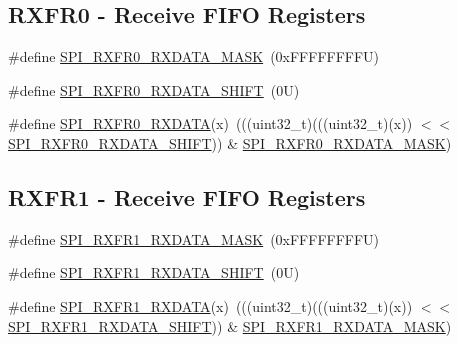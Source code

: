\subsection*{R\+X\+F\+R0 -\/ Receive F\+I\+FO Registers}
\begin{DoxyCompactItemize}
\item 
\#define \mbox{\hyperlink{group___s_p_i___register___masks_ga61ebb4d00d387b335d5b9d64d024e16f}{S\+P\+I\+\_\+\+R\+X\+F\+R0\+\_\+\+R\+X\+D\+A\+T\+A\+\_\+\+M\+A\+SK}}~(0x\+F\+F\+F\+F\+F\+F\+F\+F\+U)
\item 
\#define \mbox{\hyperlink{group___s_p_i___register___masks_ga030988e177b7d3ab914b5bb4cd734463}{S\+P\+I\+\_\+\+R\+X\+F\+R0\+\_\+\+R\+X\+D\+A\+T\+A\+\_\+\+S\+H\+I\+FT}}~(0\+U)
\item 
\#define \mbox{\hyperlink{group___s_p_i___register___masks_gaefa909022ef28f93b77915a01f7456c6}{S\+P\+I\+\_\+\+R\+X\+F\+R0\+\_\+\+R\+X\+D\+A\+TA}}(x)~(((uint32\+\_\+t)(((uint32\+\_\+t)(x)) $<$$<$ \mbox{\hyperlink{group___s_p_i___register___masks_ga030988e177b7d3ab914b5bb4cd734463}{S\+P\+I\+\_\+\+R\+X\+F\+R0\+\_\+\+R\+X\+D\+A\+T\+A\+\_\+\+S\+H\+I\+FT}})) \& \mbox{\hyperlink{group___s_p_i___register___masks_ga61ebb4d00d387b335d5b9d64d024e16f}{S\+P\+I\+\_\+\+R\+X\+F\+R0\+\_\+\+R\+X\+D\+A\+T\+A\+\_\+\+M\+A\+SK}})
\end{DoxyCompactItemize}
\subsection*{R\+X\+F\+R1 -\/ Receive F\+I\+FO Registers}
\begin{DoxyCompactItemize}
\item 
\#define \mbox{\hyperlink{group___s_p_i___register___masks_gae5778ef350adb171937498b1b49ffdb0}{S\+P\+I\+\_\+\+R\+X\+F\+R1\+\_\+\+R\+X\+D\+A\+T\+A\+\_\+\+M\+A\+SK}}~(0x\+F\+F\+F\+F\+F\+F\+F\+F\+U)
\item 
\#define \mbox{\hyperlink{group___s_p_i___register___masks_gab6747e932cee7cbdab3b46213f8d793b}{S\+P\+I\+\_\+\+R\+X\+F\+R1\+\_\+\+R\+X\+D\+A\+T\+A\+\_\+\+S\+H\+I\+FT}}~(0\+U)
\item 
\#define \mbox{\hyperlink{group___s_p_i___register___masks_gac6df902214c0e119f65e494ad20d21c6}{S\+P\+I\+\_\+\+R\+X\+F\+R1\+\_\+\+R\+X\+D\+A\+TA}}(x)~(((uint32\+\_\+t)(((uint32\+\_\+t)(x)) $<$$<$ \mbox{\hyperlink{group___s_p_i___register___masks_gab6747e932cee7cbdab3b46213f8d793b}{S\+P\+I\+\_\+\+R\+X\+F\+R1\+\_\+\+R\+X\+D\+A\+T\+A\+\_\+\+S\+H\+I\+FT}})) \& \mbox{\hyperlink{group___s_p_i___register___masks_gae5778ef350adb171937498b1b49ffdb0}{S\+P\+I\+\_\+\+R\+X\+F\+R1\+\_\+\+R\+X\+D\+A\+T\+A\+\_\+\+M\+A\+SK}})
\end{DoxyCompactItemize}
